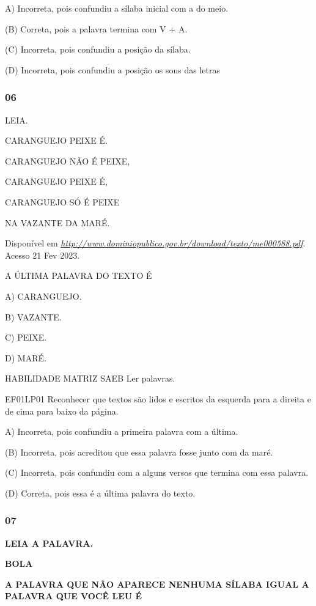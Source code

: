 \begin{escola}
A) Incorreta, pois confundiu a sílaba inicial com a do meio.

(B) Correta, pois a palavra termina com V + A.

(C) Incorreta, pois confundiu a posição da sílaba.

(D) Incorreta, pois confundiu a posição os sons das letras

\subsubsection{06}\label{section-62}

LEIA.

CARANGUEJO PEIXE É.

CARANGUEJO NÃO É PEIXE,

CARANGUEJO PEIXE É,

CARANGUEJO SÓ É PEIXE

NA VAZANTE DA MARÉ.

Disponível em
\href{http://www.dominiopublico.gov.br/download/texto/me000588.pdf}{\emph{http://www.dominiopublico.gov.br/download/texto/me000588.pdf}}.
Acesso 21 Fev 2023.

A ÚLTIMA PALAVRA DO TEXTO É

A) CARANGUEJO.

B) VAZANTE.

C) PEIXE.

D) MARÉ.

HABILIDADE MATRIZ SAEB Ler palavras.

EF01LP01 Reconhecer que textos são lidos e escritos da esquerda para a
direita e de cima para baixo da página.

A) Incorreta, pois confundiu a primeira palavra com a última.

(B) Incorreta, pois acreditou que essa palavra fosse junto com da maré.

(C) Incorreta, pois confundiu com a alguns versos que termina com essa
palavra.

(D) Correta, pois essa é a última palavra do texto.

\subsubsection{07}\label{section-63}

\textbf{LEIA A PALAVRA.}

\textbf{BOLA}

\textbf{A PALAVRA QUE NÃO APARECE NENHUMA SÍLABA IGUAL A PALAVRA QUE
VOCÊ LEU É}


\end{escola}
